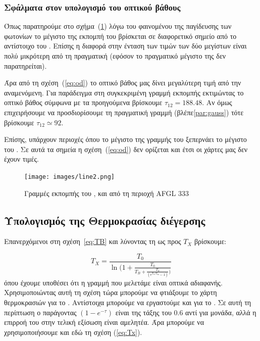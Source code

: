 \documentclass[a4paper,12pt]{memoir}
\begin{document}
\subsubsection{Σφάλματα στον υπολογισμό του οπτικού βάθους}
Όπως παρατηρούμε στο σχήμα~(\ref{fig:line2}) λόγω του φαινομένου της παγίδευσης των φωτονίων το μέγιστο της εκπομπή του  βρίσκεται σε διαφορετικό σημείο από το αντίστοιχο του . Επίσης η διαφορά στην ένταση των τιμών των δύο μεγίστων είναι πολύ μικρότερη από τη πραγματική (εφόσον το πραγματικό μέγιστο της  δεν παρατηρείται). 

Άρα από τη σχέση~(\ref{eq:od}) το οπτικό βάθος μας δίνει μεγαλύτερη τιμή από την αναμενόμενη. Για παράδειγμα στη συγκεκριμένη γραμμή εκπομπής εκτιμώντας το οπτικό βάθος σύμφωνα με τα προηγούμενα βρίσκουμε $\tau _{12}=188.48$. Αν όμως επιχειρήσουμε να προσδιορίσουμε τη πραγματική γραμμή  (βλέπε\ref{par:gauss}) τότε βρίσκουμε $\tau _{12} \simeq 92$.

Επίσης, υπάρχουν περιοχές όπου το μέγιστο της γραμμής του  ξεπερνάει το μέγιστο του . Σε αυτά τα σημεία η σχέση~(\ref{eq:od}) δεν ορίζεται και έτσι οι χάρτες μας δεν έχουν τιμές.

\begin{figure}[h]
	\centering
	\texttt{[image: images/line2.png]}
	\caption{Γραμμές εκπομπής του ,  και  από τη περιοχή AFGL 333}
	\label{fig:line2}
\end{figure}


\subsection{Υπολογισμός της Θερμοκρασίας διέγερσης}
Επανερχόμενοι στη σχέση~\ref{eq:TB} και λύνοντας τη ως προς $T_X$ βρίσκουμε:

\begin{equation}
\label{eq:Tx}
T_X=\frac{T_0}{\ln (1+\frac{T_0}{T_B+\frac{T_0}{( e^{T_0/T_{bg}}-1)})}}
\end{equation}
όπου έχουμε υποθέσει ότι η γραμμή που μελετάμε είναι οπτικά αδιαφανής. Χρησιμοποιώντας αυτή τη σχέση τώρα μπορούμε να φτιάξουμε το χάρτη θερμοκρασιών για το . 
Αντίστοιχα μπορούμε να εργαστούμε και για το . Σε αυτή τη περίπτωση ο παράγοντας $\left( 1-e^{-\tau} \right) $ είναι της τάξης του $0.6$ αντί για μονάδα, αλλά η επιρροή του στην τελική εξίσωση είναι αμελητέα. Άρα μπορούμε να χρησιμοποιήσουμε και εδώ τη σχέση (\ref{eq:Tx}).
\end{document}
